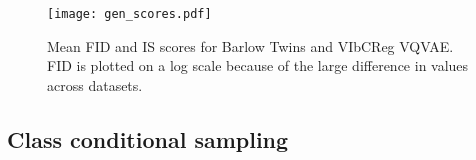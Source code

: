 \documentclass[../../thesis.tex]{subfiles}
\begin{document}
\begin{figure}[H]
    \label{fig:mean_gen_scores}
    \texttt{[image: gen\_scores.pdf]}
    \centering  
    \caption{Mean FID and IS scores for Barlow Twins and VIbCReg VQVAE. FID is plotted on a log scale because of the large difference in values across datasets.}
\end{figure}


\subsection{Class conditional sampling}
\end{document}
